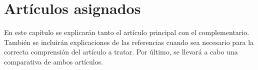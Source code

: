 \chapter{Artículos asignados}
\label{articulos}

En este capítulo se explicarán tanto el artículo principal con el complementario. También se incluirán explicaciones de las referencias cuando sea necesario para la correcta comprensión del artículo a tratar. Por último, se llevará a cabo una comparativa de ambos artículos.



